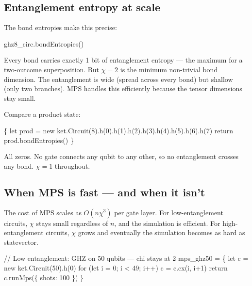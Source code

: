 \documentclass[
  11pt,
  letterpaper,
  oneside]{scrbook}
\newenvironment{Shaded}{\begin{snugshade}}{\end{snugshade}}
\newcommand{\NormalTok}[1]{\textcolor[rgb]{0.00,0.23,0.31}{#1}}
\begin{document}
\subsection{Entanglement entropy at
scale}\label{entanglement-entropy-at-scale}

The bond entropies make this precise:

\begin{Shaded}
\begin{Highlighting}[]
\NormalTok{ghz8\_circ.bondEntropies()}
\end{Highlighting}
\end{Shaded}

Every bond carries exactly 1 bit of entanglement entropy --- the maximum
for a two-outcome superposition. But \(\chi = 2\) is the minimum
non-trivial bond dimension. The entanglement is wide (spread across
every bond) but shallow (only two branches). MPS handles this
efficiently because the tensor dimensions stay small.

Compare a product state:

\begin{Shaded}
\begin{Highlighting}[]
\NormalTok{\{}
\NormalTok{  let prod = new ket.Circuit(8).h(0).h(1).h(2).h(3).h(4).h(5).h(6).h(7)}
\NormalTok{  return prod.bondEntropies()}
\NormalTok{\}}
\end{Highlighting}
\end{Shaded}

All zeros. No gate connects any qubit to any other, so no entanglement
crosses any bond. \(\chi = 1\) throughout.

\subsection{When MPS is fast --- and when it
isn't}\label{when-mps-is-fast-and-when-it-isnt}

The cost of MPS scales as \(O(n \chi^3)\) per gate layer. For
low-entanglement circuits, \(\chi\) stays small regardless of \(n\), and
the simulation is efficient. For high-entanglement circuits, \(\chi\)
grows and eventually the simulation becomes as hard as statevector.

\begin{Shaded}
\begin{Highlighting}[]
\NormalTok{// Low entanglement: GHZ on 50 qubits — chi stays at 2}
\NormalTok{mps\_ghz50 = \{}
\NormalTok{  let c = new ket.Circuit(50).h(0)}
\NormalTok{  for (let i = 0; i \textless{} 49; i++) c = c.cx(i, i+1)}
\NormalTok{  return c.runMps(\{ shots: 100 \})}
\NormalTok{\}}
\end{Highlighting}
\end{Shaded}
\end{document}
